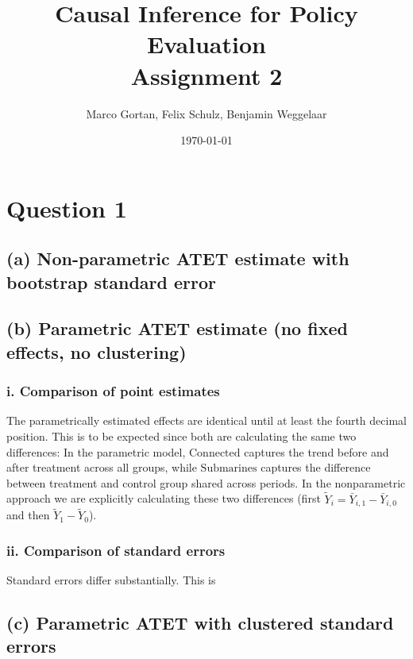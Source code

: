 \documentclass{scrartcl}
\title{Causal Inference for Policy Evaluation\\
\Large{Assignment 2}}
\author{Marco Gortan, Felix Schulz, Benjamin Weggelaar}
\date{\today}
\begin{document}
\maketitle

\section*{Question 1}

\subsection*{(a) Non-parametric ATET estimate with bootstrap standard error}



\subsection*{(b) Parametric ATET estimate (no fixed effects, no clustering)}



\subsubsection*{i. Comparison of point estimates}

The parametrically estimated effects are identical until at least the fourth decimal position. This is to be expected since both are calculating the same two differences: In the parametric model, $\text{Connected}$ captures the trend before and after treatment across all groups, while $\text{Submarines}$ captures the difference between treatment and control group shared across periods. In the nonparametric approach we are explicitly calculating these two differences (first $\tilde{Y}_i = \bar{Y}_{i,1} - \bar{Y}_{i,0}$ and then $\tilde{Y}_1 - \tilde{Y}_0$).

\subsubsection*{ii. Comparison of standard errors}

Standard errors differ substantially. This is 

\subsection*{(c) Parametric ATET with clustered standard errors}
\end{document}
